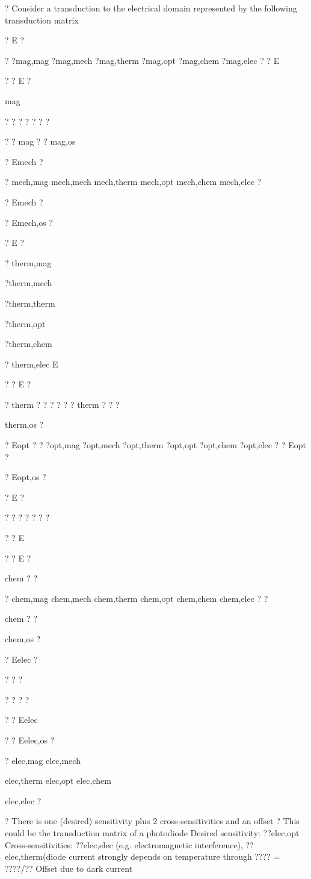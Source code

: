 \documentclass[2pt,landscape]{article}
\begin{document}
\begin{multicols*}{5}
?	Consider a transduction to the electrical domain represented by the 
following transduction matrix


? E	?


? ?mag,mag	?mag,mech	?mag,therm	?mag,opt	?mag,chem	?mag,elec ? ? E


?	? E	?


mag


? ?	?	?	?	?	?


? ?	mag ?	?	mag,os


? Emech ?


?	mech,mag	mech,mech	mech,therm	mech,opt	mech,chem	mech,elec ?


? Emech ?


? Emech,os ?


? E	?


?
therm,mag


?therm,mech


?therm,therm


?therm,opt


?therm,chem


?
therm,elec	E


?	? E	?


?	therm ? ? ?	? ? ?	therm ? ? ?


therm,os ?


? Eopt   ?	? ?opt,mag	?opt,mech	?opt,therm	?opt,opt	?opt,chem	?opt,elec   ? ? Eopt   ?


? Eopt,os   ?


? E	?


?
?	?	?	?	?	?


? ? E


?	? E	?


chem
?	?


?	chem,mag	chem,mech	chem,therm	chem,opt	chem,chem	chem,elec ?
?


chem
?	?


chem,os
?


? Eelec ?


? ?	?


?	?	?	?


? ? 
Eelec


?	? Eelec,os ?


?	elec,mag	elec,mech


elec,therm	elec,opt	elec,chem


elec,elec   ?



?	There is one (desired) sensitivity plus 2 cross-sensitivities and an offset
?	This could be the transduction matrix of a photodiode
\textbullet 	Desired sensitivity: ??elec,opt
\textbullet 	Cross-sensitivities: ??elec,elec (e.g. electromagnetic 
interference), ??elec,therm(diode current strongly 
depends on temperature through ???? = ????/??
\textbullet 	Offset due to dark current




\end{multicols*}
\end{document}

